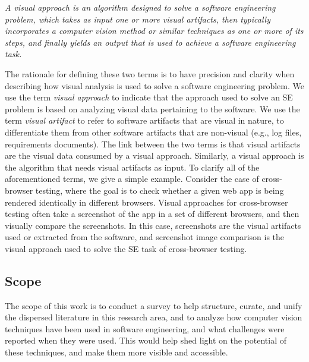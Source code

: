 \begin{defn}
\textit{A visual approach is an algorithm designed to solve a software engineering problem,
which takes as input one or more visual artifacts, 
then typically incorporates a computer vision method or similar techniques as one or more of its steps,
and finally yields an output that is used to achieve a software engineering task.
}
\end{defn}

The rationale for defining these two terms is to have
precision and clarity when describing how visual analysis is used to 
solve a software engineering problem.
We use the term \emph{visual approach} to indicate 
that the approach used to solve an SE problem 
is based on analyzing visual data pertaining to the software.
We use the term \emph{visual artifact} to refer to software artifacts
that are visual in nature, to differentiate them from other
software artifacts that are non-visual (e.g., log files,
requirements documents). 
The link between the two terms is that 
visual artifacts are the visual data consumed
by a visual approach.
Similarly, a visual approach is the algorithm
that needs visual artifacts as input. 
To clarify all of the aforementioned terms,
we give a simple example.  
Consider the case of cross-browser testing,
where the goal is to check whether a given
web app is being rendered identically in different browsers.
Visual approaches for cross-browser testing
often take a screenshot of the app in a set of 
different browsers, and then visually compare the screenshots.
In this case,
screenshots are the visual artifacts used or extracted
from the software,
and screenshot image comparison is the visual approach used to 
solve the SE task of cross-browser testing.

\subsection{Scope}\label{sec:scope}

The scope of this work is to conduct a survey
to help structure, curate, and unify
the dispersed literature in this research area,
and to analyze how computer vision techniques have
been used in software engineering,
and what challenges were reported when they were used. 
This would help shed light on the potential of these 
techniques, and make them more visible and accessible.

